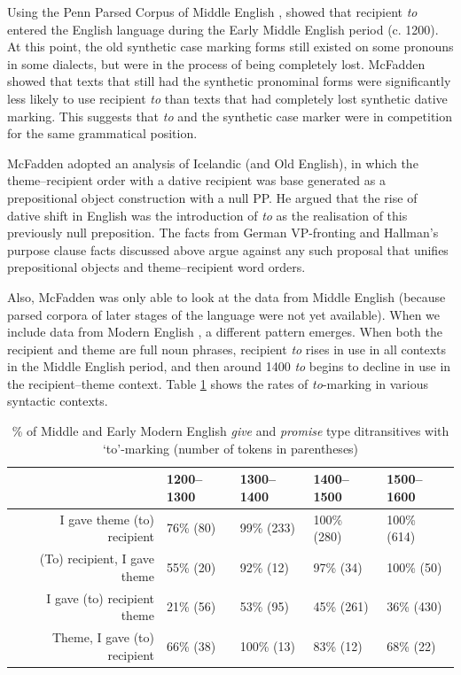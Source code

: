		Using the Penn Parsed Corpus of Middle English \citep{Kroch.2000}, \cite{McFadden.2002} showed that recipient \textit{to} entered the English language during the Early Middle English period (c. 1200). At this point, the old synthetic case marking forms still existed on some pronouns in some dialects, but were in the process of being completely lost. McFadden showed that texts that still had the synthetic pronominal forms were significantly less likely to use recipient \textit{to} than texts that had completely lost synthetic dative marking. This suggests that \textit{to} and the synthetic case marker were in competition for the same grammatical position.

		McFadden adopted an analysis of Icelandic (and Old English), in which the theme--recipient order with a dative recipient was base generated as a prepositional object construction with a null PP. He argued that the rise of dative shift in English was the introduction of \textit{to} as the realisation of this previously null preposition. The facts from German VP-fronting and Hallman's purpose clause facts discussed above argue against any such proposal that unifies prepositional objects and theme--recipient word orders.

		Also, McFadden was only able to look at the data from Middle English (because parsed corpora of later stages of the language were not yet available). When we include data from Modern English \citep{Kroch.2004,Kroch.2010,Taylor.2006}, a different pattern emerges. When both the recipient and theme are full noun phrases, recipient \textit{to} rises in use in all contexts in the Middle English period, and then around 1400 \textit{to} begins to decline in use in the recipient--theme context. Table \ref{tab:britto} shows the rates of \textit{to}-marking in various syntactic contexts.

\begin{table}[ht!]
\centering
\begin{tabular}{rllll}
  \hline
 & 1200--1300 & 1300--1400 & 1400--1500 & 1500--1600 \\ 
  \hline
I gave theme (to) recipient & 76\% (80) & 99\% (233) & 100\% (280) & 100\% (614) \\ 
  (To) recipient, I gave theme & 55\% (20) & 92\% (12) & 97\% (34) & 100\% (50) \\ 
  I gave (to) recipient theme & 21\% (56) & 53\% (95) & 45\% (261) & 36\% (430) \\ 
  Theme, I gave (to) recipient & 66\% (38) & 100\% (13) & 83\% (12) & 68\% (22) \\ 
   \hline
\end{tabular}
\caption{\% of Middle and Early Modern English \textit{give} and \textit{promise} type ditransitives with `to'-marking (number of tokens in parentheses)} 
\label{tab:britto}
\end{table}


